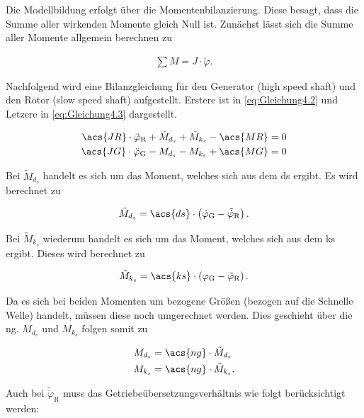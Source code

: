 Die Modellbildung erfolgt über die Momentenbilanzierung. Diese besagt, dass die Summe aller wirkenden Momente gleich Null ist. Zunächst lässt sich die Summe aller Momente allgemein berechnen zu

\begin{align}
    \sum M = J \cdot \ddot\varphi.
    \label{eq:Gleichung4.1}
\end{align}

Nachfolgend wird eine Bilanzgleichung für den Generator (high speed shaft) und den Rotor (slow speed shaft) aufgestellt. Erstere ist in \autoref{eq:Gleichung4.2} und Letzere in \autoref{eq:Gleichung4.3} dargestellt.

\begin{align}
    \label{eq:Gleichung4.2}
   \acs{JR} \cdot \ddot{\varphi}_{\mathrm{R}} + \tilde{M}_{d_s} + \tilde{M}_{k_s} - \acs{MR} &= 0 \\
   \label{eq:Gleichung4.3}
   \acs{JG} \cdot \ddot{\varphi}_{\mathrm{G}} - {M}_{d_s} - {M}_{k_s} + \acs{MG} &= 0
\end{align}

Bei $\tilde{M}_{d_s}$ handelt es sich um das Moment, welches sich aus dem \ac{ds} ergibt. Es wird berechnet zu

\begin{align}
   \tilde{M}_{d_s} = \acs{ds} \cdot \left( \dot\varphi_{\mathrm{G}} - \tilde{\dot\varphi}_{\mathrm{R}}\right).
   \label{eq:Gleichung4.4}
\end{align}

Bei $\tilde{M}_{k_s}$ wiederum handelt es sich um das Moment, welches sich aus dem \ac{ks} ergibt. Dieses wird berechnet zu

\begin{align}
   \tilde{M}_{k_s} = \acs{ks} \cdot \left( \varphi_{\mathrm{G}} - \tilde{\varphi}_{\mathrm{R}}\right).
   \label{eq:Gleichung4.5}
\end{align}

Da es sich bei beiden Momenten um bezogene Größen (bezogen auf die Schnelle Welle) handelt, müssen diese noch umgerechnet werden. Dies geschieht über die \ac{ng}. $M_{d_s}$ und $M_{k_s}$ folgen somit zu

\begin{align}
    \label{eq:Gleichung4.6}
   M_{d_s} &= \acs{ng} \cdot \tilde{M}_{d_s} \\
   \label{eq:Gleichung4.7}
   M_{k_s} &= \acs{ng} \cdot \tilde{M}_{k_s}.
\end{align}

Auch bei $\tilde{\dot\varphi}_{\mathrm{R}}$ muss das Getriebeübersetzungsverhältnis wie folgt berücksichtigt werden:

